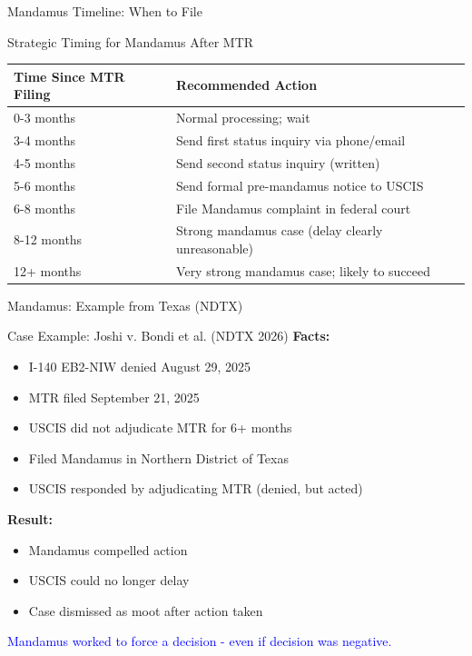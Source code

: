\documentclass[11pt]{beamer}
\begin{document}
	\begin{frame}{Mandamus Timeline: When to File}
		\scriptsize
		\begin{block}{Strategic Timing for Mandamus After MTR}
			\begin{tabular}{|p{3cm}|p{6cm}|}
				\hline
				\textbf{Time Since MTR Filing} & \textbf{Recommended Action} \\
				\hline
				0-3 months & Normal processing; wait \\
				\hline
				3-4 months & Send first status inquiry via phone/email \\
				\hline
				4-5 months & Send second status inquiry (written) \\
				\hline
				5-6 months & Send formal pre-mandamus notice to USCIS \\
				\hline
				6-8 months & File Mandamus complaint in federal court \\
				\hline
				8-12 months & Strong mandamus case (delay clearly unreasonable) \\
				\hline
				12+ months & Very strong mandamus case; likely to succeed \\
				\hline
			\end{tabular}
		\end{block}
	\end{frame}
	
	\begin{frame}{Mandamus: Example from Texas (NDTX)}
		\scriptsize
		\begin{block}{Case Example: Joshi v. Bondi et al. (NDTX 2026)}
			\textbf{Facts:}
			\begin{itemize}
				\item I-140 EB2-NIW denied August 29, 2025
				\item MTR filed September 21, 2025
				\item USCIS did not adjudicate MTR for 6+ months
				\item Filed Mandamus in Northern District of Texas
				\item USCIS responded by adjudicating MTR (denied, but acted)
			\end{itemize}
			\textbf{Result:}
			\begin{itemize}
				\item Mandamus compelled action
				\item USCIS could no longer delay
				\item Case dismissed as moot after action taken
			\end{itemize}
			\textcolor{blue}{Mandamus worked to force a decision - even if decision was negative.}
		\end{block}
	\end{frame}
	
\end{document}
